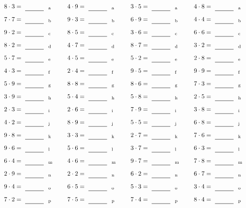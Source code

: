 \documentclass
[
  draft    = true,
  fontsize = 11pt,
  parskip  = half-
]
{scrartcl}
\begin{document}
\par\vfill\par
\begin{align*}
    \pline{8\cdot3}&=\rline{a}
  & \pline{4\cdot9}&=\rline{a}
  & \pline{3\cdot5}&=\rline{a}
  & \pline{4\cdot8}&=\rline{a} \\[1ex]
    \pline{7\cdot7}&=\rline{b}
  & \pline{9\cdot3}&=\rline{b}
  & \pline{6\cdot9}&=\rline{b}
  & \pline{4\cdot4}&=\rline{b} \\[1ex]
    \pline{9\cdot2}&=\rline{c}
  & \pline{8\cdot5}&=\rline{c}
  & \pline{3\cdot6}&=\rline{c}
  & \pline{6\cdot6}&=\rline{c} \\[1ex]
    \pline{8\cdot2}&=\rline{d}
  & \pline{4\cdot7}&=\rline{d}
  & \pline{8\cdot7}&=\rline{d}
  & \pline{3\cdot2}&=\rline{d} \\[1ex]
    \pline{5\cdot7}&=\rline{e}
  & \pline{4\cdot5}&=\rline{e}
  & \pline{5\cdot2}&=\rline{e}
  & \pline{2\cdot8}&=\rline{e} \\[1ex]
    \pline{4\cdot3}&=\rline{f}
  & \pline{2\cdot4}&=\rline{f}
  & \pline{9\cdot5}&=\rline{f}
  & \pline{9\cdot9}&=\rline{f} \\[1ex]
    \pline{5\cdot9}&=\rline{g}
  & \pline{8\cdot8}&=\rline{g}
  & \pline{8\cdot6}&=\rline{g}
  & \pline{7\cdot3}&=\rline{g} \\[1ex]
    \pline{3\cdot9}&=\rline{h}
  & \pline{5\cdot4}&=\rline{h}
  & \pline{5\cdot8}&=\rline{h}
  & \pline{2\cdot5}&=\rline{h} \\[1ex]
    \pline{2\cdot3}&=\rline{i}
  & \pline{2\cdot6}&=\rline{i}
  & \pline{7\cdot9}&=\rline{i}
  & \pline{3\cdot8}&=\rline{i} \\[1ex]
    \pline{4\cdot2}&=\rline{j}
  & \pline{8\cdot9}&=\rline{j}
  & \pline{5\cdot5}&=\rline{j}
  & \pline{6\cdot8}&=\rline{j} \\[1ex]
    \pline{9\cdot8}&=\rline{k}
  & \pline{3\cdot3}&=\rline{k}
  & \pline{2\cdot7}&=\rline{k}
  & \pline{7\cdot6}&=\rline{k} \\[1ex]
    \pline{9\cdot6}&=\rline{l}
  & \pline{5\cdot6}&=\rline{l}
  & \pline{3\cdot7}&=\rline{l}
  & \pline{6\cdot3}&=\rline{l} \\[1ex]
    \pline{6\cdot4}&=\rline{m}
  & \pline{4\cdot6}&=\rline{m}
  & \pline{9\cdot7}&=\rline{m}
  & \pline{7\cdot8}&=\rline{m} \\[1ex]
    \pline{2\cdot9}&=\rline{n}
  & \pline{2\cdot2}&=\rline{n}
  & \pline{6\cdot2}&=\rline{n}
  & \pline{6\cdot7}&=\rline{n} \\[1ex]
    \pline{9\cdot4}&=\rline{o}
  & \pline{6\cdot5}&=\rline{o}
  & \pline{5\cdot3}&=\rline{o}
  & \pline{3\cdot4}&=\rline{o} \\[1ex]
    \pline{7\cdot2}&=\rline{p}
  & \pline{7\cdot5}&=\rline{p}
  & \pline{7\cdot4}&=\rline{p}
  & \pline{8\cdot4}&=\rline{p}
\end{align*}
\end{document}

